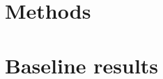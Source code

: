 \documentclass[fleqn,moreauthors,10pt]{ds_report}
\affiliation{\textit{Advisors: Slavko Žitnik}}
\begin{document}
\flushbottom 

\maketitle 

\thispagestyle{empty} 



	








\section*{Methods}




\section*{Baseline results}
\end{document}
